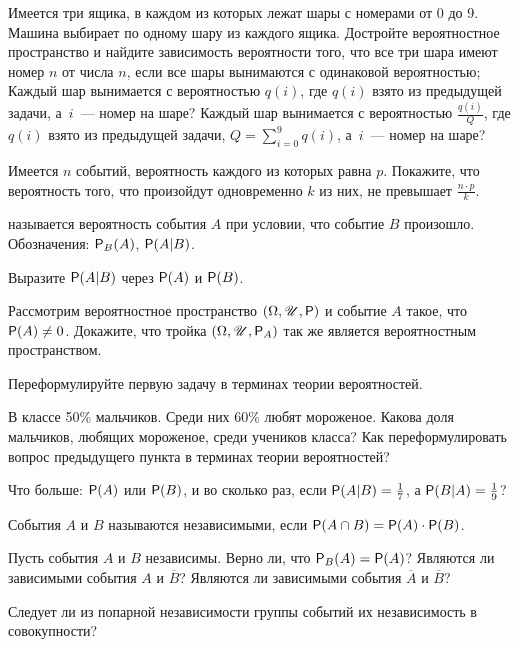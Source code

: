 \documentclass[a4paper,12pt]{article}
\begin{document}
  Имеется три ящика, в каждом из которых лежат шары с номерами от 0 до 9. Машина выбирает по одному шару из каждого ящика. Достройте вероятностное пространство и найдите зависимость вероятности того, что все три шара имеют номер $n$ от числа $n$, если
   все шары вынимаются с одинаковой вероятностью;
   Каждый шар вынимается с вероятностью $q(i)$, где $q(i)$ взято из предыдущей задачи, а~$i$~--- номер на шаре?
  \vspace{-0.2cm}
   Каждый шар вынимается с вероятностью $\frac{q(i)}{Q}$, где $q(i)$ взято из предыдущей задачи, $Q=\sum\limits_{i=0}^{9}q(i)$, а~$i$~--- номер на шаре?

  Имеется $n$ событий, вероятность каждого из которых равна $p$. Покажите, что вероятность того, что произойдут одновременно $k$ из них, не превышает $\frac{n\cdot p}{k}$.

%
   называется вероятность события $A$ при условии, что событие $B$ произошло. Обозначения: $\mathsf{P}_B(A)$, $\mathsf{P}(A|B)$.

  Выразите $\mathsf{P}(A|B)$ через $\mathsf{P}(A)$ и $\mathsf{P}(B)$.

  Рассмотрим вероятностное пространство $(\Omega,\mathscr{U},\mathsf{P})$ и событие $A$ такое, что $\mathsf{P}(A)\ne0$. Докажите, что тройка $(\Omega,\mathscr{U},\mathsf{P}_A)$ так же является вероятностным пространством.

  Переформулируйте первую задачу в терминах теории вероятностей.

  В классе 50\% мальчиков. Среди них 60\% любят мороженое.  Какова доля мальчиков, любящих мороженое, среди учеников класса?  Как переформулировать вопрос предыдущего пункта в терминах теории вероятностей?

  Что больше: $\mathsf{P}(A)$ или $\mathsf{P}(B)$, и во сколько раз, если  $\mathsf{P}(A|B)=\frac{1}{7}$, а $\mathsf{P}(B|A)=\frac{1}{9}$?

  События $A$ и $B$ называются  независимыми, если $\mathsf{P}(A\cap B)=\mathsf{P}(A)\cdot\mathsf{P}(B)$.

  Пусть события $A$ и $B$ независимы.
   Верно ли, что $\mathsf{P}_B(A)=\mathsf{P}(A)$?
   Являются ли зависимыми события $A$ и $\overline{B}$?
   Являются ли зависимыми события $\overline{A}$ и $\overline{B}$?

  Следует ли из попарной независимости группы событий их независимость в совокупности?
\end{document}
